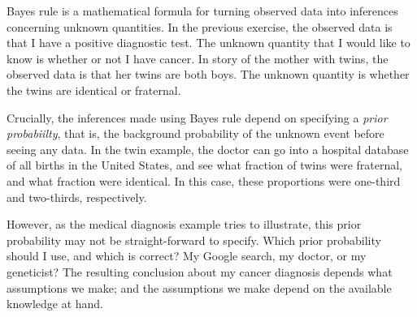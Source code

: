 \documentclass[11pt]{article}
\theoremstyle{definition}
\begin{document}
Bayes rule is a mathematical formula for turning observed data into
inferences concerning unknown quantities.
In the previous exercise, the observed data is that I have a positive diagnostic test.
The unknown quantity that I would like to know is whether or not I have cancer.
In story of the mother with twins, the observed data is that her
twins are both boys. The unknown quantity is whether the twins are identical or fraternal.

Crucially, the inferences made using Bayes rule depend on specifying a \textit{prior probabiilty},
that is, the background probability of the unknown event before seeing any data.
In the twin example, the doctor can go into a hospital database of all births in the United States,
and see what fraction of twins were fraternal, and what fraction were identical.
In this case, these proportions were one-third and two-thirds, respectively.

However, as the medical diagnosis example tries to illustrate, this prior probability
may not be straight-forward to specify. Which prior probability should I use, and which is correct? My Google search, my doctor,
or my geneticist? The resulting conclusion about my cancer diagnosis
depends what assumptions we make; and the assumptions we make depend
on the available knowledge at hand.
\end{document}
